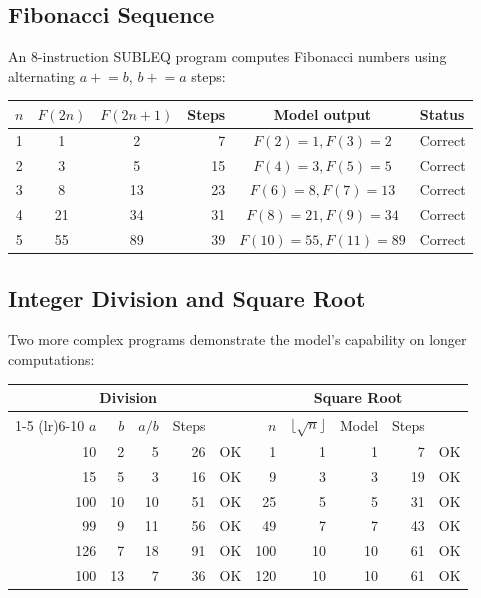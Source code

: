 \documentclass[11pt,a4paper]{article}
\begin{document}
\subsection{Fibonacci Sequence}

An 8-instruction SUBLEQ program computes Fibonacci numbers using alternating $a \mathrel{+}= b$, $b \mathrel{+}= a$ steps:

\begin{center}
\begin{tabular}{cccrcl}
\toprule
$n$ & $F(2n)$ & $F(2n{+}1)$ & Steps & Model output & Status \\
\midrule
1 & 1 & 2 & 7 & $F(2){=}1, F(3){=}2$ & Correct \\
2 & 3 & 5 & 15 & $F(4){=}3, F(5){=}5$ & Correct \\
3 & 8 & 13 & 23 & $F(6){=}8, F(7){=}13$ & Correct \\
4 & 21 & 34 & 31 & $F(8){=}21, F(9){=}34$ & Correct \\
5 & 55 & 89 & 39 & $F(10){=}55, F(11){=}89$ & Correct \\
\bottomrule
\end{tabular}
\end{center}

\subsection{Integer Division and Square Root}

Two more complex programs demonstrate the model's capability on longer computations:

\begin{center}
\begin{tabular}{rrrrlrrrrl}
\toprule
\multicolumn{5}{c}{\textbf{Division}} & \multicolumn{5}{c}{\textbf{Square Root}} \\
\cmidrule(lr){1-5} \cmidrule(lr){6-10}
$a$ & $b$ & $a/b$ & Steps & & $n$ & $\lfloor\sqrt{n}\rfloor$ & Model & Steps & \\
\midrule
10 & 2 & 5 & 26 & OK & 1 & 1 & 1 & 7 & OK \\
15 & 5 & 3 & 16 & OK & 9 & 3 & 3 & 19 & OK \\
100 & 10 & 10 & 51 & OK & 25 & 5 & 5 & 31 & OK \\
99 & 9 & 11 & 56 & OK & 49 & 7 & 7 & 43 & OK \\
126 & 7 & 18 & 91 & OK & 100 & 10 & 10 & 61 & OK \\
100 & 13 & 7 & 36 & OK & 120 & 10 & 10 & 61 & OK \\
\bottomrule
\end{tabular}
\end{center}
\end{document}
